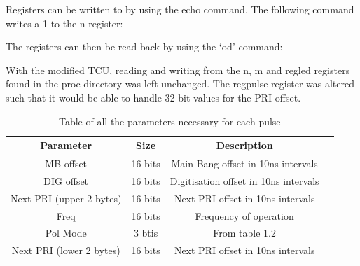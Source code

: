 \documentclass[12pt, a4paper]{article}
\begin{document}
Registers can be written to by using the echo command. The following command writes a 1 to the n register:



The registers can then be read back by using the ‘od’ command:




With the modified TCU, reading and writing from the n, m and reg\textunderscore led registers found in the proc directory was left unchanged. The reg\textunderscore pulse register was altered such that it would be able to handle 32 bit values for the PRI offset.

\begin{table}
\centering
\begin{tabular}{ |c|c|c|c| } 
 \hline
 Parameter & Size &  Description \\ 
 
 \hline 
 MB offset & 16 bits & Main Bang offset in 10ns intervals \\ 
 
 \hline
 DIG offset & 16 bits & Digitisation offset in 10ns intervals \\
 
 \hline
 Next PRI (upper 2 bytes) & 16 bits & Next PRI offset in 10ns intervals \\
 
 \hline
 Freq & 16 bits & Frequency of operation \\
 
 \hline
 Pol Mode & 3 btis & From table 1.2 \\
 
 \hline
 Next PRI (lower 2 bytes) & 16 bits & Next PRI offset in 10ns intervals\\
 \hline 
\end{tabular}
\caption{Table of all the parameters necessary for each pulse}
\label{table:1}
\end{table}
\end{document}

